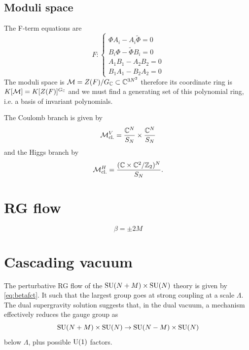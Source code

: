     \subsection{Moduli space}

        The F-term equations are
        \begin{equation}
            F:
            \begin{cases}
                \Phi A_i-A_i\tilde{\Phi} = 0\\
                B_i\Phi-\tilde{\Phi}B_i = 0\\
                A_1B_1-A_2B_2 = 0\\
                B_1A_1-B_2A_2 = 0
            \end{cases}
        \end{equation}
        The moduli space is $\mathcal{M}=Z(F)/G_{\mathbb{C}}\subset\mathbb{C}^{3N^2}$ therefore its coordinate ring is $K[\mathcal{M}]=K[Z(F)]^{G_{\mathbb{C}}}$ and we must find a generating set of this polynomial ring, i.e. a basis of invariant polynomials.

        The Coulomb branch is given by
        \begin{equation}
            \mathcal{M}^V_{\text{cl.}} = \frac{\mathbb{C}^N}{S_N}\times\frac{\mathbb{C}^N}{S_N}
        \end{equation}
        and the Higgs branch by
        \begin{equation}
            \mathcal{M}^H_{\text{cl.}} = \frac{(\mathbb{C}\times\mathbb{C}^2/\mathbb{Z}_2)^N}{S_N}.
        \end{equation}

\section{RG flow}

    \begin{equation}
        \beta=\pm 2M\label{eq:betafct}
    \end{equation}

\section{Cascading vacuum}

    The perturbative RG flow of the $\text{SU}(N+M)\times\text{SU}(N)$ theory is given by \eqref{eq:betafct}. It such that the largest group goes at strong coupling at a scale $\Lambda$. The dual supergravity solution suggests that, in the dual vacuum, a mechanism effectively reduces the gauge group as
    \begin{equation}
        \text{SU}(N+M)\times\text{SU}(N)\to\text{SU}(N-M)\times\text{SU}(N)\label{eq:gaugegroupereduction}
    \end{equation}
    below $\Lambda$, plus possible $\text{U}(1)$ factors. 
    
